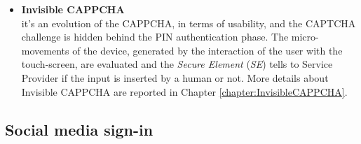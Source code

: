 \begin{itemize}
{}
\item{\textbf{Invisible CAPPCHA}\\
it's an evolution of the CAPPCHA, in terms of usability, and the CAPTCHA challenge is hidden behind the PIN authentication phase\cite{Invisible_CAPPCHA}. The micro-movements of the device, generated by the interaction of the user with the touch-screen, are evaluated and the \textit{Secure Element} (\textit{SE}) tells to Service Provider if the input is inserted by a human or not. More details about Invisible CAPPCHA are reported in Chapter \ref{chapter:InvisibleCAPPCHA}.
}
\end{itemize}

\subsection{Social media sign-in}


